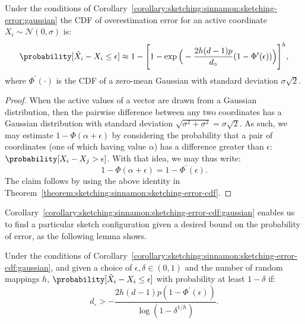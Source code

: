 \begin{corollary}
    \label{corollary:sketching:sinnamon:sketching-error-cdf:gaussian}
    Under the conditions of Corollary~\ref{corollary:sketching:sinnamon:sketching-error:gaussian}
    the CDF of overestimation error for an active coordinate $X_i \sim \mathcal{N}(0, \sigma)$ is:
    \begin{equation*}
        \probability[\tilde{X}_i - X_i \leq \epsilon]
        \approx 1 - \Bigg[ 1 - \exp\Big(-\frac{2 h (d - 1) p}{d_\circ} (1 - \Phi^\prime(\epsilon)) \Big) \Bigg]^h,
    \end{equation*}
    where $\Phi^\prime(\cdot)$ is the CDF of a zero-mean Gaussian with standard deviation $\sigma\sqrt{2}$.
\end{corollary}
\begin{proof}
    When the active values of a vector are drawn from a Gaussian distribution,
    then the pairwise difference between any two coordinates has a Gaussian distribution with
    standard deviation $\sqrt{\sigma^2 + \sigma^2}=\sigma \sqrt{2}$.
    As such, we may estimate $1 - \Phi(\alpha + \epsilon)$ by considering the
    probability that a pair of coordinates (one of which having value $\alpha$) has 
    a difference greater than $\epsilon$: $\probability[X_i - X_j > \epsilon]$.
    With that idea, we may thus write:
    \begin{equation*}
        1 - \Phi(\alpha + \epsilon) = 1 - \Phi^\prime(\epsilon).
    \end{equation*}
    The claim follows by using the above identity in Theorem~\ref{theorem:sketching:sinnamon:sketching-error-cdf}.
\end{proof}

Corollary~\ref{corollary:sketching:sinnamon:sketching-error-cdf:gaussian}
enables us to find a particular sketch configuration given a desired bound on the probability of error,
as the following lemma shows.

\begin{lemma}
    Under the conditions of Corollary~\ref{corollary:sketching:sinnamon:sketching-error-cdf:gaussian},
    and given a choice of $\epsilon, \delta \in (0, 1)$ and the number of random mappings $h$,
    $\probability[\tilde{X}_i - X_i \leq \epsilon]$ with probability at least $1 - \delta$ if:
    \begin{equation*}
        d_\circ > - \frac{2h (d - 1)p (1 - \Phi^\prime(\epsilon))}{\log (1 - \delta^{1/h})}.
    \end{equation*}
\end{lemma}

